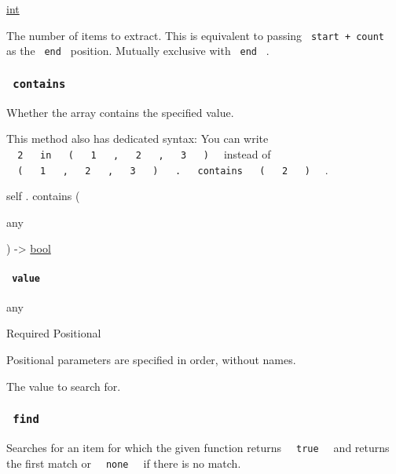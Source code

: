 \href{/docs/reference/foundations/int/}{int}

The number of items to extract. This is equivalent to passing
\texttt{\ start\ +\ count\ } as the \texttt{\ end\ } position. Mutually
exclusive with \texttt{\ end\ } .

\subsubsection{\texorpdfstring{\texttt{\ contains\ }}{ contains }}\label{definitions-contains}

Whether the array contains the specified value.

This method also has dedicated syntax: You can write
\texttt{\ }{\texttt{\ 2\ }}\texttt{\ }{\texttt{\ in\ }}\texttt{\ }{\texttt{\ (\ }}\texttt{\ }{\texttt{\ 1\ }}\texttt{\ }{\texttt{\ ,\ }}\texttt{\ }{\texttt{\ 2\ }}\texttt{\ }{\texttt{\ ,\ }}\texttt{\ }{\texttt{\ 3\ }}\texttt{\ }{\texttt{\ )\ }}\texttt{\ }
instead of
\texttt{\ }{\texttt{\ (\ }}\texttt{\ }{\texttt{\ 1\ }}\texttt{\ }{\texttt{\ ,\ }}\texttt{\ }{\texttt{\ 2\ }}\texttt{\ }{\texttt{\ ,\ }}\texttt{\ }{\texttt{\ 3\ }}\texttt{\ }{\texttt{\ )\ }}\texttt{\ }{\texttt{\ .\ }}\texttt{\ }{\texttt{\ contains\ }}\texttt{\ }{\texttt{\ (\ }}\texttt{\ }{\texttt{\ 2\ }}\texttt{\ }{\texttt{\ )\ }}\texttt{\ }
.

self { . } { contains } (

{ { any } }

) -\textgreater{} \href{/docs/reference/foundations/bool/}{bool}

\paragraph{\texorpdfstring{\texttt{\ value\ }}{ value }}\label{definitions-contains-value}

{ any }

{Required} {{ Positional }}

\label{definitions-contains-value-positional-tooltip}
Positional parameters are specified in order, without names.

The value to search for.

\subsubsection{\texorpdfstring{\texttt{\ find\ }}{ find }}\label{definitions-find}

Searches for an item for which the given function returns
\texttt{\ }{\texttt{\ true\ }}\texttt{\ } and returns the first match or
\texttt{\ }{\texttt{\ none\ }}\texttt{\ } if there is no match.

